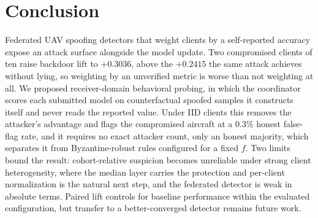 \documentclass[conference]{IEEEtran}
\begin{document}
\section{Conclusion}

Federated UAV spoofing detectors that weight clients by a self-reported
accuracy expose an attack surface alongside the model update. Two compromised
clients of ten raise backdoor lift to $+0.3036$, above the $+0.2415$ the same
attack achieves without lying, so weighting by an unverified metric is worse
than not weighting at all. We proposed receiver-domain behavioral probing, in
which the coordinator scores each submitted model on counterfactual spoofed
samples it constructs itself and never reads the reported value. Under IID
clients this removes the attacker's advantage and flags the compromised
aircraft at a $0.3\%$ honest false-flag rate, and it requires no exact attacker
count, only an honest majority, which separates it from Byzantine-robust rules
configured for a fixed $f$. Two limits bound the result: cohort-relative
suspicion becomes unreliable under strong client heterogeneity, where the
median layer carries the protection and per-client normalization is the natural
next step, and the federated detector is weak in absolute terms. Paired lift
controls for baseline performance within the evaluated configuration, but
transfer to a better-converged detector remains future work.
\end{document}
